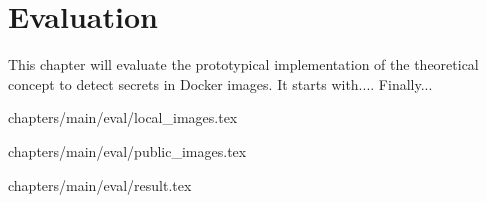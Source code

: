 \chapter{Evaluation}
\label{ch:eval}
This chapter will evaluate the prototypical implementation of the theoretical concept to detect secrets in Docker images. 
It starts with.... Finally...

 {chapters/main/eval/local_images.tex}

 {chapters/main/eval/public_images.tex}

 {chapters/main/eval/result.tex}